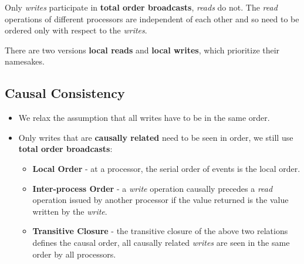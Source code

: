 \documentclass[11pt]{article}
\begin{document}
Only \textit{writes} participate in \textbf{total order broadcasts}, \textit{reads} do not.
The \textit{read} operations of different processors are independent of each other and so need to be ordered only with respect to the \textit{writes}.

There are two versions \textbf{local reads} and \textbf{local writes}, which prioritize their namesakes.

\subsection{Causal Consistency}
\begin{itemize}
  \item We relax the assumption that all writes have to be in the same order.
  \item Only writes that are \textbf{causally related} need to be seen in order, we still use \textbf{total order broadcasts}:
    \begin{itemize}
      \item \textbf{Local Order} - at a processor, the serial order of events is the local order.
      \item \textbf{Inter-process Order} - a \textit{write} operation causally precedes a \textit{read} operation issued by another processor if the value returned is the value written by the \textit{write}.
      \item \textbf{Transitive Closure} - the transitive closure of the above two relations defines the causal order, all causally related \textit{writes} are seen in the same order by all processors.
    \end{itemize}
\end{itemize}
\end{document}

